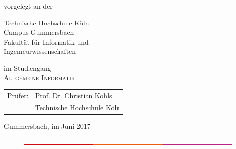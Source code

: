 \begin{titlepage}
\begin{center}
\vspace{1.0cm}



\begin{large}
vorgelegt an der\\ 
\vspace{0.2cm}
\begin{scshape}
Technische Hochschule Köln\\
Campus Gummersbach\\
Fakultät für Informatik und\\
Ingenieurwissenschaften\\
\end{scshape}
\end{large}

\vspace{0.4cm}

\begin{large}
im Studiengang\\ 
\vspace{0.2cm}
\textsc{Allgemeine Informatik}
\end{large}


\vspace{1.0cm}

\begin{tabular}{rl}
        Prüfer:  &  Prof. Dr. Christian Kohls\\
       					&  \small Technische Hochschule Köln \\[1.0em]
\end{tabular}

\vspace{0.8cm}

\begin{large}
Gummersbach, im Juni 2017
\end{large}
\vspace{\distance}
\end{center}
\begin{figure}[!ht]
		\includegraphics[width=\textwidth]{images/balken.png}
\end{figure}


\end{titlepage}
